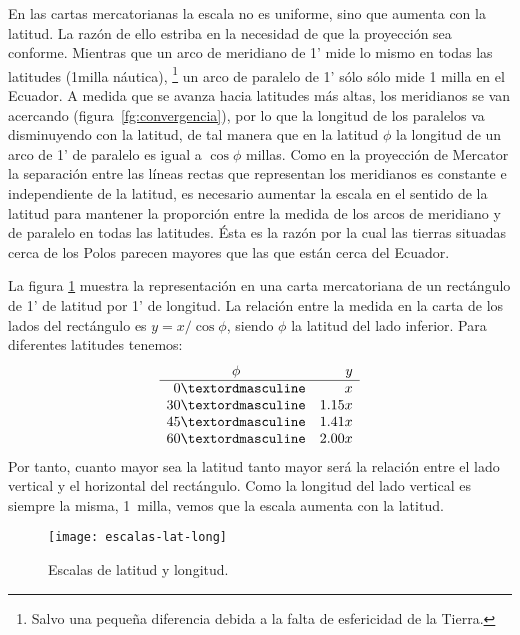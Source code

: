 En las cartas mercatorianas  la escala  no es uniforme,  sino que aumenta con la latitud. La razón de ello estriba en la necesidad de que la proyección sea conforme. Mientras que un arco de meridiano de 1'  mide lo mismo en todas las latitudes (1milla náutica),%
\footnote{Salvo una pequeña diferencia debida a la falta de esfericidad de la Tierra.}
un arco de paralelo de 1' sólo sólo mide 1 milla en el Ecuador. A medida que se avanza hacia latitudes más 
altas, los meridianos se van acercando (figura~\ref{fg:convergencia}), por lo que la longitud de los paralelos 
va disminuyendo con la latitud, de tal manera que en la latitud $\phi$ la longitud de un arco de 
1’ de paralelo es igual a $\cos \phi$ millas. Como en la proyección de Mercator la separación entre las líneas rectas que representan los meridianos es constante e independiente de la latitud,  es necesario aumentar la escala en el sentido de la latitud para mantener la proporción entre la medida de los arcos de meridiano y de paralelo en todas las latitudes.
Ésta es la razón por la cual las tierras situadas cerca de los Polos parecen mayores que las que están cerca del Ecuador. 

La figura \ref{fg:escalas-lat-long} muestra la representación en una carta mercatoriana de un rectángulo de 
1’ de latitud por 1’ de longitud. La relación entre la medida en la carta de los lados del rectángulo es $y = x/\cos \phi$,
siendo $\phi$ la latitud del lado inferior. 
Para diferentes latitudes tenemos:
\[ 
\begin{array}{rr}
\multicolumn{1}{c}{\phi} & y \\ \hline
0º & x \\
30º & 1.15 x\\
45º & 1.41 x \\
60º & 2.00 x\\
\end{array}
\]
Por tanto, cuanto mayor sea la latitud tanto mayor será la relación entre el lado vertical y el horizontal del rectángulo. Como la longitud del lado vertical es siempre la misma, 1~milla, vemos que la escala aumenta con la latitud.

\begin{figure}[hbtp]
\begin{center}
\texttt{[image: escalas-lat-long]}\\
\caption{Escalas de latitud y longitud.}
\label{fg:escalas-lat-long}
\end{center}
\end{figure}

